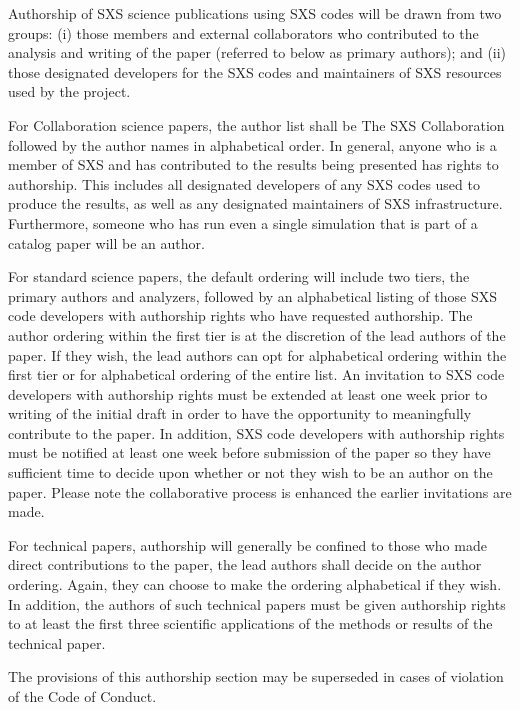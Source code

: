 \documentclass[12pt]{article}
\begin{document}
Authorship of SXS science publications using SXS codes will be drawn
from two groups: (i) those members and external collaborators who
contributed to the analysis and writing of the paper (referred to
below as primary authors); and (ii) those designated developers for
the SXS codes and maintainers of SXS resources used by the project.

For Collaboration science papers, the author list shall be The SXS
Collaboration followed by the author names in alphabetical order. In
general, anyone who is a member of SXS and has contributed to the
results being presented has rights to authorship.  This includes all
designated developers of any SXS codes used to produce the results, as
well as any designated maintainers of SXS infrastructure.
Furthermore, someone who has run even a single simulation that is part
of a catalog paper will be an author.

For standard science papers, the default ordering will include two
tiers, the primary authors and analyzers, followed by an alphabetical
listing of those SXS code developers with authorship rights who have
requested authorship. The author ordering within the first tier is at
the discretion of the lead authors of the paper. If they wish, the
lead authors can opt for alphabetical ordering within the first tier
or for alphabetical ordering of the entire list.  An invitation to SXS
code developers with authorship rights must be extended at least one
week prior to writing of the initial draft in order to have the
opportunity to meaningfully contribute to the paper.  In addition, SXS
code developers with authorship rights must be notified at least one
week before submission of the paper so they have sufficient time to
decide upon whether or not they wish to be an author on the paper.
Please note the collaborative process is enhanced the earlier
invitations are made.

For technical papers, authorship will generally be confined to those
who made direct contributions to the paper, the lead authors shall
decide on the author ordering. Again, they can choose to make the
ordering alphabetical if they wish.  In addition, the authors of such
technical papers must be given authorship rights to at least the first
three scientific applications of the methods or results of the
technical paper.

The provisions of this authorship section may be superseded in cases of
violation of the Code of Conduct.

\appendix
\end{document}
